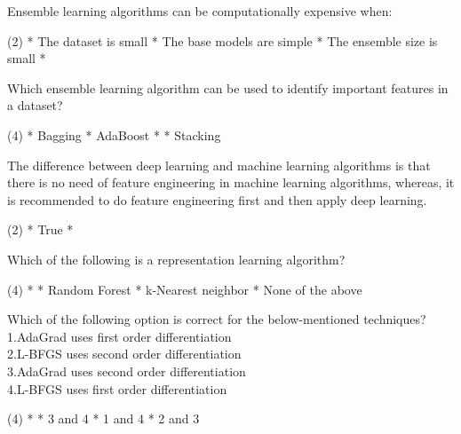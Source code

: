 \documentclass[10pt]{extarticle}
\begin{document}
\begin{exercise}
    Ensemble learning algorithms can be computationally expensive when:
    \begin{choice} (2)
        * The dataset is small
        * The base models are simple
        * The ensemble size is small
        * 
    \end{choice}
\end{exercise}
\begin{solution}
\end{solution}

\begin{exercise}
    Which ensemble learning algorithm can be used to identify important features in a dataset?
    \begin{choice} (4)
        * Bagging
        * AdaBoost
        * 
        * Stacking
    \end{choice}
\end{exercise}
\begin{solution}
\end{solution}

\begin{exercise}
    The difference between deep learning and machine learning algorithms is that there is no need of feature engineering in machine learning algorithms, whereas, it is recommended to do feature engineering first and then apply deep learning.
    \begin{choice} (2)
        * True
        * 
    \end{choice}
\end{exercise}
\begin{solution}
\end{solution}

\begin{exercise}
    Which of the following is a representation learning algorithm?
    \begin{choice} (4)
        * 
        * Random Forest
        * k-Nearest neighbor
        * None of the above
    \end{choice}
\end{exercise}
\begin{solution}
\end{solution}

\begin{exercise}
    Which of the following option is correct for the below-mentioned techniques?\\
    1.AdaGrad uses first order differentiation\\
    2.L-BFGS uses second order differentiation\\
    3.AdaGrad uses second order differentiation\\
    4.L-BFGS uses first order differentiation
    \begin{choice} (4)
        * 
        * 3 and 4
        * 1 and 4
        * 2 and 3
    \end{choice}
\end{exercise}
\begin{solution}
\end{solution}
\end{document}
